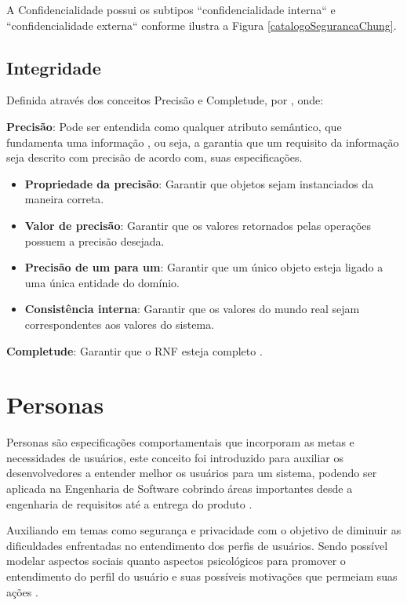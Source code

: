 A Confidencialidade possui os subtipos ``confidencialidade interna`` e ``confidencialidade externa`` conforme ilustra a Figura \ref{catalogoSegurancaChung}.
 

\subsection{Integridade}
\label{subsec:integridade}
 
Definida através dos conceitos Precisão e Completude, por \cite{chung2012non}, onde: 

\textbf{Precisão}: Pode ser entendida como qualquer atributo semântico, que fundamenta uma informação \cite{chung2012non}, ou seja, a garantia que um requisito da informação seja descrito com precisão de acordo com, suas especificações. 

\begin{itemize}
	\item \textbf{Propriedade da precisão}: Garantir que objetos sejam instanciados da maneira correta. 
	
	\item \textbf{Valor de precisão}: Garantir que os valores retornados pelas operações possuem a precisão desejada.
	
	\item \textbf{Precisão de um para um}: Garantir que um único objeto esteja ligado a uma única entidade do domínio. 
	
	\item \textbf{Consistência interna}: Garantir que os valores do mundo real sejam correspondentes aos valores do sistema.
\end{itemize}

\textbf{Completude}: Garantir que o RNF esteja completo \cite{chung2012non}. 

\section{Personas}
\label{sec:personas}

Personas são especificações comportamentais que incorporam as metas e necessidades de usuários, este conceito foi introduzido para auxiliar os desenvolvedores a entender melhor os usuários para um sistema, podendo ser aplicada na Engenharia de Software cobrindo áreas importantes desde a engenharia de requisitos até a entrega do produto \cite{ford2017characterizing}. 

Auxiliando em temas como segurança e privacidade com o objetivo de diminuir as dificuldades enfrentadas no entendimento dos perfis de usuários. Sendo possível modelar aspectos sociais quanto aspectos psicológicos para promover o entendimento do perfil do usuário e suas possíveis motivações que permeiam suas ações \cite{ford2017characterizing} \cite{daelaboraccao}. 

